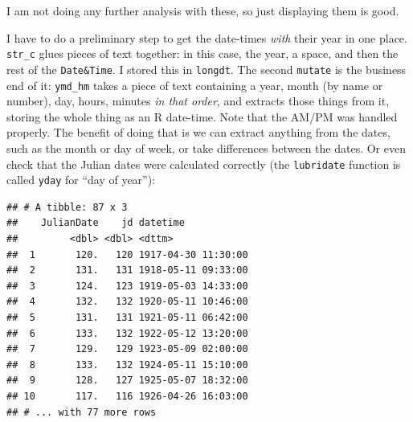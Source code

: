 \documentclass[]{tufte-book}
\newenvironment{Shaded}{}{}
\newcommand{\DataTypeTok}[1]{\textcolor[rgb]{0.56,0.13,0.00}{#1}}
\newcommand{\KeywordTok}[1]{\textcolor[rgb]{0.00,0.44,0.13}{\textbf{#1}}}
\newcommand{\NormalTok}[1]{#1}
\newcommand{\OperatorTok}[1]{\textcolor[rgb]{0.40,0.40,0.40}{#1}}
\newcommand{\StringTok}[1]{\textcolor[rgb]{0.25,0.44,0.63}{#1}}
\theoremstyle{definition}
\theoremstyle{definition}
\theoremstyle{definition}
\theoremstyle{remark}
\begin{document}
I am not doing any further analysis with these, so just displaying them
is good.

I have to do a preliminary step to get the date-times \emph{with} their
year in one place. \texttt{str\_c} glues pieces of text together: in
this case, the year, a space, and then the rest of the
\texttt{Date\&Time}. I stored this in \texttt{longdt}. The second
\texttt{mutate} is the business end of it: \texttt{ymd\_hm} takes a
piece of text containing a year, month (by name or number), day, hours,
minutes \emph{in that order}, and extracts those things from it, storing
the whole thing as an R date-time. Note that the AM/PM was handled
properly. The benefit of doing that is we can extract anything from the
dates, such as the month or day of week, or take differences between the
dates. Or even check that the Julian dates were calculated correctly
(the \texttt{lubridate} function is called \texttt{yday} for ``day of
year''):

\begin{Shaded}
\end{Shaded}

\begin{verbatim}
## # A tibble: 87 x 3
##    JulianDate    jd datetime           
##         <dbl> <dbl> <dttm>             
##  1       120.   120 1917-04-30 11:30:00
##  2       131.   131 1918-05-11 09:33:00
##  3       124.   123 1919-05-03 14:33:00
##  4       132.   132 1920-05-11 10:46:00
##  5       131.   131 1921-05-11 06:42:00
##  6       133.   132 1922-05-12 13:20:00
##  7       129.   129 1923-05-09 02:00:00
##  8       133.   132 1924-05-11 15:10:00
##  9       128.   127 1925-05-07 18:32:00
## 10       117.   116 1926-04-26 16:03:00
## # ... with 77 more rows
\end{verbatim}
\end{document}

